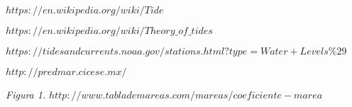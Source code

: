 \documentclass[12pt]{article}
\begin{document}
\begin{doublespace}
\newpage
\renewcommand{\refname}{\section*{Referencias}}
\begin{thebibliography}{9}
 \textsc{$https://en.wikipedia.org/wiki/Tide$}

 \textsc{$https://en.wikipedia.org/wiki/Theory\_of\_tides$}

 \textsc{$https://tidesandcurrents.noaa.gov/stations.html?type=Water+Levels\%29$}

 \textsc{$http://predmar.cicese.mx/$}

 \textit{Figura 1.} \textsc{$http://www.tablademareas.com/mareas/coeficiente-marea$}
\end{thebibliography}
\end{doublespace}
\end{document}
